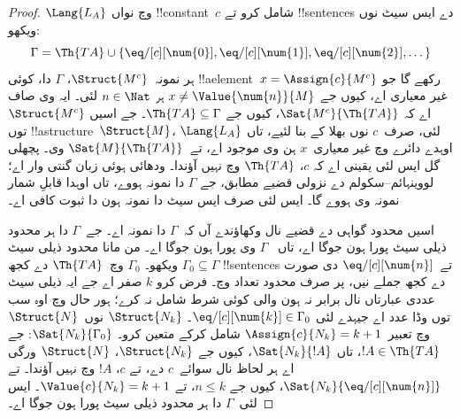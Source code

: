 \documentclass[../../../include/open-logic-section]{subfiles}
\begin{document}
\begin{proof}
$\Lang{L_A}$ وچ نواں !!{constant}~$c$ شامل کرو
تے !!{sentence}s دے ایس سیٹ نوں ویکھو:
\[
\Gamma = \Th{TA} \cup \{\eq/[c][\num{0}], \eq/[c][\num{1}],
\eq/[c][\num{2}], \dots\}
\]
ہر نمونہ~$\Struct{M^c}$، $\Gamma$ دا، کوئی
!!a{element}~$x =
\Assign{c}{M^c}$ رکھے گا جو غیر معیاری اے،
کیوں جے $x \neq \Value{\num{n}}{M}$
ہر $n \in \Nat$ لئی۔
ایہ وی صاف اے کہ $\Sat{M^c}{\Th{TA}}$،
کیوں جے $\Th{TA} \subseteq \Gamma$۔
جے اسیں $\Struct{M^c}$ توں
!!a{structure}~$\Struct{M}$، $\Lang{L_A}$ لئی،
صرف~$c$ نوں بھلا کے بنا لئیے،
تاں اوہدے دائرے وچ غیر معیاری~$x$
ہن وی موجود اے، تے~$\Sat{M}{\Th{TA}}$ وی۔
پچھلی گل ایس لئی یقینی اے کہ $c$،
$\Th{TA}$ وچ نہیں آؤندا۔ ودھائی ہوئی زبان گنتی وار اے؛
لووینہائم--سکولم دے نزولی قضیے مطابق، جے $\Gamma$ دا نمونہ ہووے،
تاں اوہدا قابلِ شمار نمونہ وی ہووے گا۔ ایس لئی صرف ایس سیٹ دا
نمونہ ہون دا ثبوت کافی اے۔

اسیں محدود گواہی دے قضیے نال وکھاؤندے آں
کہ~$\Gamma$ دا نمونہ اے۔ جے~$\Gamma$ دا
ہر محدود ذیلی سیٹ پورا ہون جوگا اے، تاں
~$\Gamma$ وی پورا ہون جوگا اے۔
من مانا محدود ذیلی سیٹ $\Gamma_0 \subseteq
\Gamma$ ویکھو۔ $\Gamma_0$ وچ~$\Th{TA}$ دے کجھ
!!{sentence}s تے~$\eq/[c][\num{n}]$
دی صورت دے کجھ جملے نیں، پر صرف محدود تعداد وچ۔
فرض کرو $k$ صفر اے جے ایہ ذیلی سیٹ عددی عبارتاں نال برابر نہ
ہون والی کوئی شرط شامل نہ کرے؛ ہور حال وچ اوہ سب توں وڈا عدد اے جیہدے لئی
$\eq/[c][\num{k}] \in \Gamma_0$۔
$\Struct{N_k}$ نوں~$\Struct{N}$ وچ
تعبیر~$\Assign{c}{N_k} = k+1$
شامل کرکے متعین کرو۔
$\Sat{N_k}{\Gamma_0}$: جے $!A
\in \Th{TA}$، تاں $\Sat{N_k}{!A}$،
کیوں جے $\Struct{N_k}$، $\Struct{N}$ ورگی اے
ہر لحاظ نال سوائے~$c$ دے،
تے $c$، $!A$ وچ نہیں آؤندا۔
تے $\Sat{N_k}{\eq/[c][\num{n}]}$،
کیوں جے $n \le k$، تے
$\Value{c}{N_k} = k+1$۔
ایس لئی~$\Gamma$ دا ہر محدود ذیلی سیٹ
پورا ہون جوگا اے۔
\end{proof}
\end{document}
